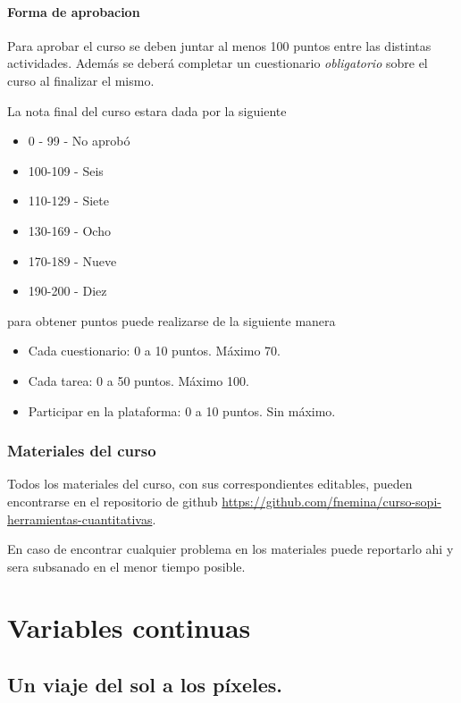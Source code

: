 \documentclass[a4paper]{book}
\begin{document}
\subsection{Forma de aprobacion}
Para aprobar el curso se deben juntar al menos 100 puntos entre las distintas actividades.
Adem\'as se deber\'a completar un cuestionario \emph{obligatorio} sobre el curso
al finalizar el mismo.

La nota final del curso estara dada por la siguiente

\begin{itemize}
\item 0 - 99 - No aprobó
\item 100-109 - Seis
\item 110-129 - Siete
\item 130-169 - Ocho
\item 170-189 - Nueve
\item 190-200 - Diez
\end{itemize}

para obtener puntos puede realizarse de la siguiente manera

\begin{itemize}
  \item Cada cuestionario: 0 a 10 puntos. Máximo 70.
  \item Cada tarea: 0 a 50 puntos. Máximo 100.
  \item Participar en la plataforma: 0 a 10 puntos. Sin máximo.
\end{itemize}

\section{Materiales del curso}
Todos los materiales del curso, con sus correspondientes editables, pueden
encontrarse en el repositorio de github \url{https://github.com/fnemina/curso-sopi-herramientas-cuantitativas}.

En caso de encontrar cualquier problema en los materiales puede reportarlo ahi y sera
subsanado en el menor tiempo posible.

\part{Variables continuas}

\chapter{Un viaje del sol a los p\'ixeles.}
\label{viaje}

\end{document}

